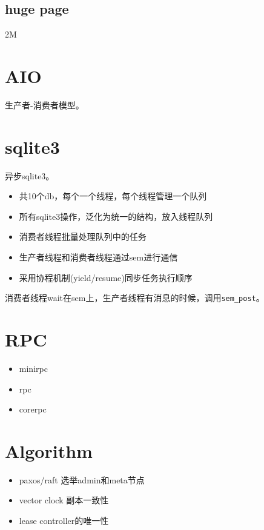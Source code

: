 \subsection{huge page}

2M

\section{AIO}

生产者-消费者模型。

\section{sqlite3}

异步sqlite3。

\begin{itemize}
    \item 共10个db，每个一个线程，每个线程管理一个队列
    \item 所有sqlite3操作，泛化为统一的结构，放入线程队列
    \item 消费者线程批量处理队列中的任务
    \item 生产者线程和消费者线程通过sem进行通信
    \item 采用协程机制(yield/resume)同步任务执行顺序
\end{itemize}

消费者线程wait在sem上，生产者线程有消息的时候，调用\verb|sem_post|。

\section{RPC}

\begin{itemize}
    \item minirpc
    \item rpc
    \item corerpc
\end{itemize}

\section{Algorithm}

\begin{itemize}
    \item paxos/raft 选举admin和meta节点
    \item vector clock 副本一致性
    \item lease controller的唯一性
\end{itemize}
